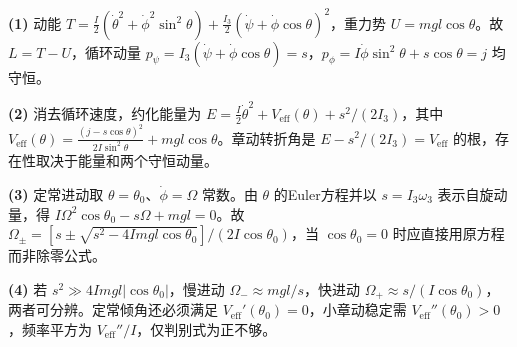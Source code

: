 \par\noindent\textbf{(1)} 动能 \(T=\tfrac I2(\dot\theta^2+\dot\phi^2\sin^2\theta)+\tfrac{I_3}{2}(\dot\psi+\dot\phi\cos\theta)^2\)，重力势 \(U=mgl\cos\theta\)。故 \(L=T-U\)，循环动量 \(p_\psi=I_3(\dot\psi+\dot\phi\cos\theta)=s\)，\(p_\phi=I\dot\phi\sin^2\theta+s\cos\theta=j\) 均守恒。
\par\noindent\textbf{(2)} 消去循环速度，约化能量为 \(E=\tfrac I2\dot\theta^2+V_{\mathrm{eff}}(\theta)+s^2/(2I_3)\)，其中 \(V_{\mathrm{eff}}(\theta)=\frac{(j-s\cos\theta)^2}{2I\sin^2\theta}+mgl\cos\theta\)。章动转折角是 \(E-s^2/(2I_3)=V_{\mathrm{eff}}\) 的根，存在性取决于能量和两个守恒动量。
\par\noindent\textbf{(3)} 定常进动取 \(\theta=\theta_0\)、\(\dot\phi=\Omega\) 常数。由 \(\theta\) 的Euler方程并以 \(s=I_3\omega_3\) 表示自旋动量，得 \(I\Omega^2\cos\theta_0-s\Omega+mgl=0\)。故 \(\Omega_\pm=[s\pm\sqrt{s^2-4Imgl\cos\theta_0}]/(2I\cos\theta_0)\)，当 \(\cos\theta_0=0\) 时应直接用原方程而非除零公式。
\par\noindent\textbf{(4)} 若 \(s^2\gg 4Imgl|\cos\theta_0|\)，慢进动 \(\Omega_-\approx mgl/s\)，快进动 \(\Omega_+\approx s/(I\cos\theta_0)\)，两者可分辨。定常倾角还必须满足 \(V_{\mathrm{eff}}'(\theta_0)=0\)，小章动稳定需 \(V_{\mathrm{eff}}''(\theta_0)>0\)，频率平方为 \(V_{\mathrm{eff}}''/I\)，仅判别式为正不够。
